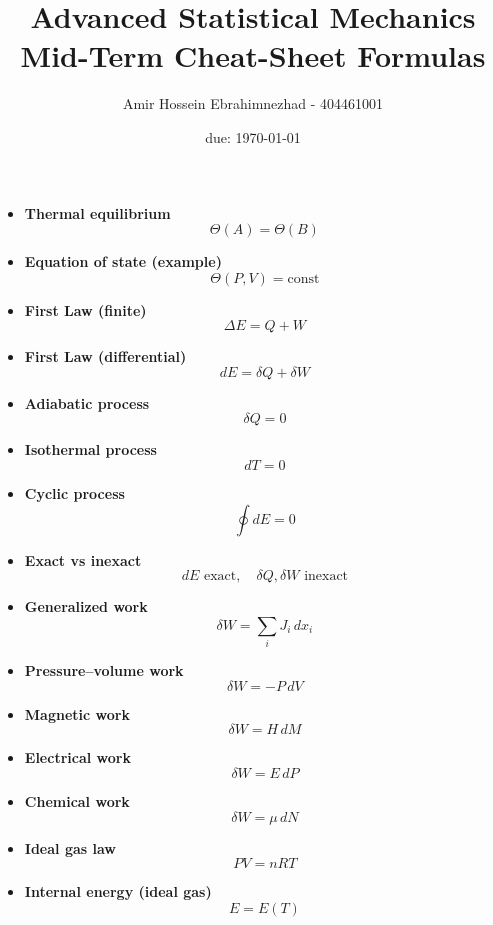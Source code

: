 \documentclass[9pt,twocoloumn]{article}
\title{Advanced Statistical Mechanics Mid-Term Cheat-Sheet Formulas}
\author{Amir Hossein Ebrahimnezhad - 404461001}
\date{due: \today}
\begin{document}
\maketitle

\begin{itemize}

\item \textbf{Thermal equilibrium}
\[
\Theta(A) = \Theta(B)
\]

\item \textbf{Equation of state (example)}
\[
\Theta(P,V) = \text{const}
\]

\item \textbf{First Law (finite)}
\[
\Delta E = Q + W
\]

\item \textbf{First Law (differential)}
\[
dE = \delta Q + \delta W
\]

\item \textbf{Adiabatic process}
\[
\delta Q = 0
\]

\item \textbf{Isothermal process}
\[
dT = 0
\]

\item \textbf{Cyclic process}
\[
\oint dE = 0
\]

\item \textbf{Exact vs inexact}
\[
dE \text{ exact}, \quad \delta Q, \delta W \text{ inexact}
\]

\item \textbf{Generalized work}
\[
\delta W = \sum_i J_i \, dx_i
\]

\item \textbf{Pressure--volume work}
\[
\delta W = -P\,dV
\]

\item \textbf{Magnetic work}
\[
\delta W = H\,dM
\]

\item \textbf{Electrical work}
\[
\delta W = E\,dP
\]

\item \textbf{Chemical work}
\[
\delta W = \mu\,dN
\]

\item \textbf{Ideal gas law}
\[
PV = nRT
\]

\item \textbf{Internal energy (ideal gas)}
\[
E = E(T)
\]


\end{itemize}
\end{document}
